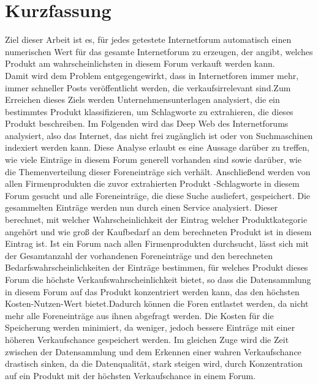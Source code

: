 \documentclass[%
a4paper,
DIV12, 
2.5headlines, 
bigheadings, 
titlepage, 
openbib,
]{scrartcl}
\newcommand{\mainmatter}{\pagenumbering{arabic}\setcounter{page}{1}}
\begin{document}
	\section*{Kurzfassung}{%
Ziel dieser Arbeit ist es, für jedes getestete Internetforum automatisch einen numerischen Wert für das gesamte Internetforum zu erzeugen, der angibt, welches Produkt am wahrscheinlichsten in diesem Forum verkauft werden kann.\\  Damit wird dem Problem entgegengewirkt, dass in Internetforen immer mehr, immer schneller Posts veröffentlicht werden, die verkaufsirrelevant sind.Zum Erreichen dieses Ziels werden Unternehmensunterlagen analysiert, die ein bestimmtes Produkt klassifizieren, um Schlagworte zu extrahieren, die dieses Produkt beschreiben. Im Folgenden wird das Deep Web des Internetforums analysiert, also das Internet, das nicht frei zugänglich ist oder von Suchmaschinen indexiert werden kann.  Diese Analyse erlaubt es eine Aussage darüber zu treffen, wie viele Einträge in diesem Forum generell vorhanden sind sowie darüber, wie die Themenverteilung dieser Foreneinträge sich verhält. Anschließend werden von allen Firmenprodukten die zuvor extrahierten Produkt -Schlagworte in diesem Forum gesucht und alle Foreneinträge, die diese Suche ausliefert, gespeichert. Die gesammelten Einträge werden nun durch einen Service analysiert.  Dieser berechnet, mit welcher Wahrscheinlichkeit der Eintrag welcher Produktkategorie angehört und wie groß der Kaufbedarf an dem berechneten Produkt ist in diesem Eintrag ist. Ist ein Forum nach allen Firmenprodukten durchsucht, lässt sich mit der Gesamtanzahl der vorhandenen Foreneinträge und den berechneten Bedarfswahrscheinlichkeiten der Einträge bestimmen, für welches Produkt dieses Forum die höchste Verkaufswahrscheinlichkeit bietet, so dass die Datensammlung in diesem Forum auf das Produkt konzentriert werden kann, das den höchsten Kosten-Nutzen-Wert bietet.Dadurch können die Foren entlastet werden, da nicht mehr alle Foreneinträge aus ihnen abgefragt werden. Die Kosten für die Speicherung werden minimiert, da weniger, jedoch bessere Einträge mit einer höheren Verkaufschance gespeichert werden. Im gleichen Zuge wird die Zeit zwischen der Datensammlung und dem Erkennen einer wahren Verkaufschance drastisch sinken, da die Datenqualität, stark steigen wird, durch Konzentration auf ein Produkt mit der höchsten Verkaufschance in einem Forum.}
\newpage
	
	\tableofcontents
	\clearpage
	\mainmatter

	
	
	
	
	
	
		
	
	\clearpage
	\nocite{*}
    	
   	
	
\end{document}
